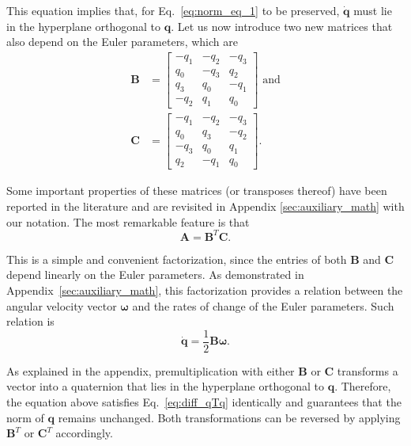 \documentclass[aip,jcp,reprint,amsmath,amssymb]{revtex4-1}
\newcommand{\mt}[1]{\boldsymbol{\mathbf{#1}}}           %
\newcommand{\vt}[1]{\boldsymbol{\mathbf{#1}}}           %
\newcommand{\tr}[1]{#1^T}                               %
\begin{document}
This equation implies that, for Eq.~\ref{eq:norm_eq_1} to be preserved, $\dot{\vt q}$ must lie in the hyperplane orthogonal to $\vt q$. Let us now introduce two new matrices that also depend on the Euler parameters, which are
\begin{subequations}
\label{eq:def_B_and_C}
\begin{align}
\mt B &= \left[
\begin{array}{rrrr}
-q_1 & -q_2 & -q_3 \\
 q_0 & -q_3 &  q_2 \\
 q_3 &  q_0 & -q_1 \\
-q_2 &  q_1 &  q_0
\end{array}
\right] \text{ and} \label{eq:def_B} \\
\mt C &= \left[
\begin{array}{rrrr}
-q_1 & -q_2 & -q_3 \\
 q_0 &  q_3 & -q_2 \\
-q_3 &  q_0 &  q_1 \\
 q_2 & -q_1 &  q_0
\end{array}
\right].
\end{align}
\end{subequations}

Some important properties of these matrices (or transposes thereof) have been reported in the literature\cite{Haug1989, Shuster1993, Dichmann1999, Ravishankar2004, Nielsen2012} and are revisited in Appendix \ref{sec:auxiliary_math} with our notation. The most remarkable feature is that
\begin{equation}
\label{eq:factorization_of_A}
{\mt A} = \tr{\mt B}{\mt C}.
\end{equation}

This is a simple and convenient factorization, since the entries of both $\mt B$ and $\mt C$ depend linearly on the Euler parameters. As demonstrated in Appendix~\ref{sec:auxiliary_math}, this factorization provides a relation between the angular velocity vector $\vt \omega$ and the rates of change of the Euler parameters. Such relation is
\begin{equation}
\label{eq:relation_qdot_omega}
\dot{\vt q} = \frac{1}{2} \mt B \vt \omega.
\end{equation}

As explained in the appendix, premultiplication with either $\mt B$ or $\mt C$ transforms a vector into a quaternion that lies in the hyperplane orthogonal to $\vt q$. Therefore, the equation above satisfies Eq.~\ref{eq:diff_qTq} identically and guarantees that the norm of $\vt q$ remains unchanged. Both transformations can be reversed by applying $\tr{\vt B}$ or $\tr{\vt C}$ accordingly.
\end{document}
